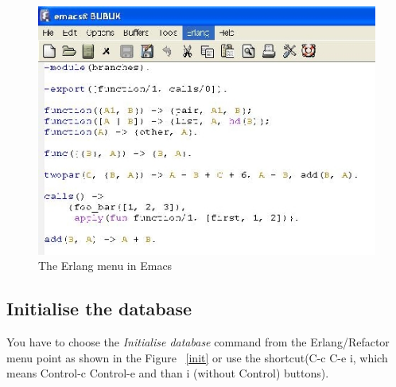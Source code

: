 \documentclass[12pt]{article}
\begin{document}
\begin{center}
\begin{figure}[htbp]
    
    \includegraphics[scale=0.80]{newmenu.jpg}
   \caption{The Erlang menu in Emacs}
  \label{newmenu}
\end{figure}
\end{center}



\subsection{Initialise the database}

You have to choose the {\it Initialise database} command from the Erlang/Refactor menu point as shown in the Figure ~\ref{init} or use the shortcut(C-c C-e i, which means Control-c Control-e and than i (without Control) buttons).
\end{document}

